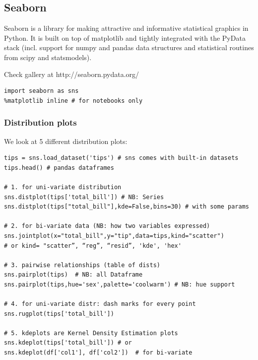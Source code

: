 \documentclass[11pt]{article}
\begin{document}
\subsection{Seaborn}
Seaborn is a library for making attractive and informative statistical graphics in Python. It is built on top of matplotlib and tightly integrated with the PyData stack (incl. support for numpy and pandas data structures and statistical routines from scipy and statsmodels).

Check gallery at http://seaborn.pydata.org/
\begin{lstlisting}
import seaborn as sns
%matplotlib inline # for notebooks only
\end{lstlisting}


\subsubsection{Distribution plots}
We look at 5 different distribution plots:
\begin{lstlisting}
tips = sns.load_dataset('tips') # sns comes with built-in datasets
tips.head() # pandas dataframes

# 1. for uni-variate distribution
sns.distplot(tips['total_bill']) # NB: Series
sns.distplot(tips["total_bill"],kde=False,bins=30) # with some params

# 2. for bi-variate data (NB: how two variables expressed)
sns.jointplot(x="total_bill",y="tip",data=tips,kind="scatter")
# or kind= "scatter”, “reg”, “resid”, 'kde', 'hex'

# 3. pairwise relationships (table of dists)
sns.pairplot(tips)  # NB: all Dataframe
sns.pairplot(tips,hue='sex',palette='coolwarm') # NB: hue support

# 4. for uni-variate distr: dash marks for every point 
sns.rugplot(tips['total_bill'])

# 5. kdeplots are Kernel Density Estimation plots
sns.kdeplot(tips['total_bill']) # or
sns.kdeplot(df['col1'], df['col2'])  # for bi-variate
\end{lstlisting}

\end{document}

